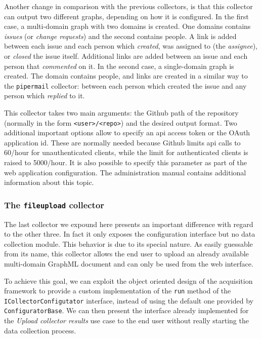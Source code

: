 Another change in comparison with the previous collectors, is that this collector can output two different graphs, depending on how it is configured. In the first case, a multi-domain graph with two domains is created. One domains contains \emph{issues} (or \emph{change requests}) and the second contains people. A link is added between each issue and each person which \emph{created}, was assigned to (the \emph{assignee}), or \emph{closed} the issue itself. Additional links are added between an issue and each person that \emph{commented} on it. In the second case, a single-domain graph is created. The domain contains people, and links are created in a similar way to the \texttt{pipermail} collector: between each person which created the issue and any person which \emph{replied} to it.

This collector takes two main arguments: the Github path of the repository (normally in the form \texttt{<user>/<repo>}) and the desired output format. Two additional important options allow to specify an \gls{api} access token or the OAuth application \gls{id}. These are normally needed because Github limits \gls{api} calls to 60/hour for unauthenticated clients, while the limit for authenticated clients is raised to 5000/hour. It is also possible to specify this parameter as part of the web application configuration. The administration manual contains additional information about this topic.

\subsubsection{The \texttt{fileupload} collector}

The last collector we expound here presents an important difference with regard to the other three. In fact it only exposes the configuration interface but no data collection module. This behavior is due to its special nature. As easily guessable from its name, this collector allows the end user to upload an already available multi-domain GraphML document and can only be used from the web interface.

To achieve this goal, we can exploit the object oriented design of the acquisition framework to provide a custom implementation of the \texttt{run} method of the \texttt{ICollectorConfigutator} interface, instead of using the default one provided by \texttt{ConfiguratorBase}. We can then present the interface already implemented for the \emph{Upload collector results} use case to the end user without really starting the data collection process.

